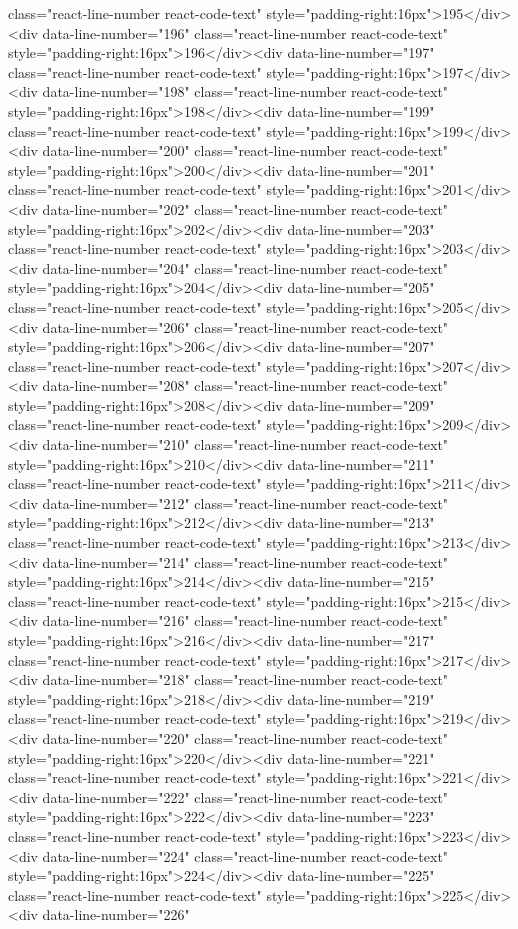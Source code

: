 {{{{{{{{{{{{{{{{{{{{{{{{{{{{{{{class="react-line-number react-code-text" style="padding-right:16px">195</div><div data-line-number="196" class="react-line-number react-code-text" style="padding-right:16px">196</div><div data-line-number="197" class="react-line-number react-code-text" style="padding-right:16px">197</div><div data-line-number="198" class="react-line-number react-code-text" style="padding-right:16px">198</div><div data-line-number="199" class="react-line-number react-code-text" style="padding-right:16px">199</div><div data-line-number="200" class="react-line-number react-code-text" style="padding-right:16px">200</div><div data-line-number="201" class="react-line-number react-code-text" style="padding-right:16px">201</div><div data-line-number="202" class="react-line-number react-code-text" style="padding-right:16px">202</div><div data-line-number="203" class="react-line-number react-code-text" style="padding-right:16px">203</div><div data-line-number="204" class="react-line-number react-code-text" style="padding-right:16px">204</div><div data-line-number="205" class="react-line-number react-code-text" style="padding-right:16px">205</div><div data-line-number="206" class="react-line-number react-code-text" style="padding-right:16px">206</div><div data-line-number="207" class="react-line-number react-code-text" style="padding-right:16px">207</div><div data-line-number="208" class="react-line-number react-code-text" style="padding-right:16px">208</div><div data-line-number="209" class="react-line-number react-code-text" style="padding-right:16px">209</div><div data-line-number="210" class="react-line-number react-code-text" style="padding-right:16px">210</div><div data-line-number="211" class="react-line-number react-code-text" style="padding-right:16px">211</div><div data-line-number="212" class="react-line-number react-code-text" style="padding-right:16px">212</div><div data-line-number="213" class="react-line-number react-code-text" style="padding-right:16px">213</div><div data-line-number="214" class="react-line-number react-code-text" style="padding-right:16px">214</div><div data-line-number="215" class="react-line-number react-code-text" style="padding-right:16px">215</div><div data-line-number="216" class="react-line-number react-code-text" style="padding-right:16px">216</div><div data-line-number="217" class="react-line-number react-code-text" style="padding-right:16px">217</div><div data-line-number="218" class="react-line-number react-code-text" style="padding-right:16px">218</div><div data-line-number="219" class="react-line-number react-code-text" style="padding-right:16px">219</div><div data-line-number="220" class="react-line-number react-code-text" style="padding-right:16px">220</div><div data-line-number="221" class="react-line-number react-code-text" style="padding-right:16px">221</div><div data-line-number="222" class="react-line-number react-code-text" style="padding-right:16px">222</div><div data-line-number="223" class="react-line-number react-code-text" style="padding-right:16px">223</div><div data-line-number="224" class="react-line-number react-code-text" style="padding-right:16px">224</div><div data-line-number="225" class="react-line-number react-code-text" style="padding-right:16px">225</div><div data-line-number="226" }}}}}}}}}}}}}}}}}}}}}}}}}}}}}}}
